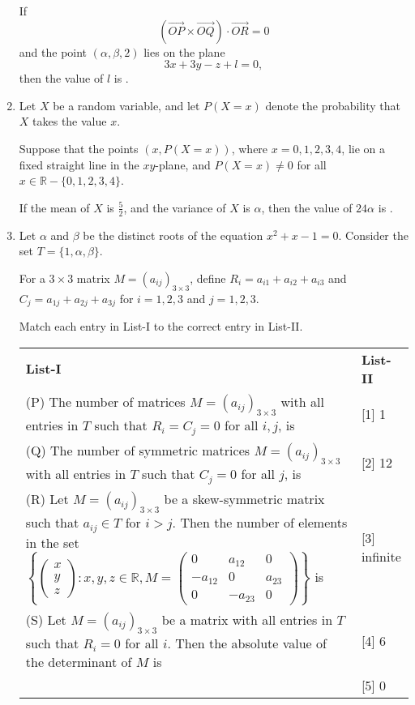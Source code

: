 \documentclass[12pt,a4paper]{article}
\begin{document}
\begin{enumerate}
    If  
\[
    \left( \overrightarrow{OP} \times \overrightarrow{OQ} \right) \cdot \overrightarrow{OR} = 0
\]
    and the point $(\alpha, \beta, 2)$ lies on the plane  
\[
    3x + 3y - z + l = 0,
\]
    then the value of $l$ is \underline{\quad \quad}.
\item Let $X$ be a random variable, and let $P(X = x)$ denote the probability that $X$ takes the value $x$.  

    Suppose that the points $\left( x, P(X = x) \right)$, where $x = 0,1,2,3,4$, lie on a fixed straight line in the $xy$-plane, and $P(X = x) \neq 0$ for all $x \in \mathbb{R} - \{0,1,2,3,4\}$.  

    If the mean of $X$ is $\frac{5}{2}$, and the variance of $X$ is $\alpha$, then the value of $24\alpha$ is \underline{\quad \quad}.
\item Let $\alpha$ and $\beta$ be the distinct roots of the equation $x^2 + x - 1 = 0$. Consider the set $T = \{1, \alpha, \beta\}$.

For a $3 \times 3$ matrix $M = (a_{ij})_{3 \times 3}$, define $R_i = a_{i1} + a_{i2} + a_{i3}$ and $C_j = a_{1j} + a_{2j} + a_{3j}$ for $i = 1, 2, 3$ and $j = 1, 2, 3$.

Match each entry in List-I to the correct entry in List-II.

\begin{center}
\begin{tabular}{p{12cm}l}
\textbf{List-I} & \textbf{List-II} \\ [8pt]
(P) The number of matrices $M = (a_{ij})_{3 \times 3}$ with all entries in $T$ such that $R_i = C_j = 0$ for all $i, j$, is & [1] 1 \\ [8pt]
(Q) The number of symmetric matrices $M = (a_{ij})_{3 \times 3}$ with all entries in $T$ such that $C_j = 0$ for all $j$, is & [2] 12 \\ [8pt]
(R) Let $M = (a_{ij})_{3 \times 3}$ be a skew-symmetric matrix such that $a_{ij} \in T$ for $i > j$. Then the number of elements in the set 
$\left\{ \begin{pmatrix} x \\ y \\ z \end{pmatrix} : x, y, z \in \mathbb{R}, M = \begin{pmatrix} 0 & a_{12} & 0 \\ -a_{12} & 0 & a_{23} \\ 0 & -a_{23} & 0 \end{pmatrix} \right\}$
is & [3] infinite \\ [8pt]
(S) Let $M = (a_{ij})_{3 \times 3}$ be a matrix with all entries in $T$ such that $R_i = 0$ for all $i$. Then the absolute value of the determinant of $M$ is & [4] 6 \\ [8pt]
 & [5] 0 \\ [8pt]
\end{tabular}
\end{center}


\end{enumerate}
\end{document}
